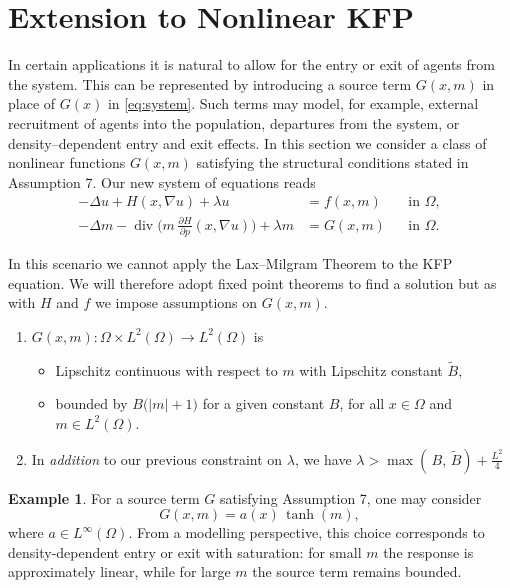 \documentclass[11pt]{article}
\numberwithin{equation}{section}
\theoremstyle{definition}
\newtheorem{example}[example]{Example}
\theoremstyle{remark}
\DeclareMathOperator{\diver}{div}
\newcommand{\Ltwo}{L^2(\Omega)}
\newcommand{\Hp}{\frac{\partial H}{\partial p}}
\begin{document}
\section{Extension to Nonlinear KFP}
In certain applications it is natural to allow for the entry or exit of agents from the system. 
This can be represented by introducing a source term $G(x,m)$ in place of $G(x)$ in \cref{eq:system}. 
Such terms may model, for example, external recruitment of agents into the population, departures from the system, or density–dependent entry and exit effects. 
In this section we consider a class of nonlinear functions $G(x,m)$ satisfying the structural conditions stated in Assumption 7.
Our new system of equations reads
\begin{equation}
\label{eq:system2}
\begin{aligned}
-\Delta u + H(x,\nabla u) + \lambda u &= f(x,m) && \text{in } \Omega,\\
-\Delta m - \diver\!\bigl(m\,\Hp(x,\nabla u)\bigr) + \lambda m &= G(x,m) && \text{in } \Omega.
\end{aligned}
\end{equation}

In this scenario we cannot apply the Lax--Milgram Theorem to the KFP equation. We will therefore adopt fixed point theorems 
to find a solution but as with $H$ and $f$ we impose assumptions on $G(x,m)$.
\begin{enumerate}[label=\arabic*., leftmargin=*, itemsep=0.35em, resume]
\item $G(x,m):\Omega \times \Ltwo \to \Ltwo$ is
  \begin{itemize}[leftmargin=*, itemsep=0.25em]
    \item Lipschitz continuous with respect to $m$ with Lipschitz constant $\tilde{B}$,
    \item bounded by $B\bigl(|m|+1\bigr)$ for a given constant $B$, for all $x\in \Omega$ and $m \in \Ltwo$.
  \end{itemize}
\item In \emph{addition} to our previous constraint on $\lambda$, we have $\lambda > \max(\,B, \,\tilde{B}) +\frac{L^2}{4}$
\end{enumerate}
\begin{example}
For a source term $G$ satisfying Assumption 7, one may consider
\[
G(x,m) = a(x)\,\tanh(m),
\]
where $a \in L^\infty(\Omega)$. From a modelling perspective, this choice corresponds to density-dependent entry 
or exit with saturation: for small $m$ the response is approximately linear, 
while for large $m$ the source term remains bounded.
\end{example}
\end{document}
